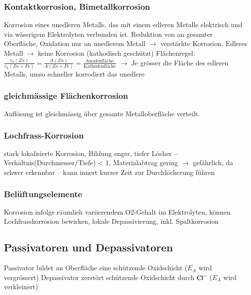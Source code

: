 {\subsubsection{Kontaktkorrosion, Bimetallkorrosion}
Korrosion eines unedleren Metalls, das mit einem edleren Metalle elektrisch und via wässrigem Elektrolyten verbunden ist.
Reduktion von  an gesamter Oberfläche, Oxidation nur an unedlerem Metall $\rightarrow$ verstärkte Korrosion, Edleres Metall $\rightarrow$ keine Korrosion (kathodisch geschützt) \newline
 Flächenregel: $\frac{v_k(Zn)}{v_k(Zn + Fe)} = \frac{A(Zn)}{A(Zn + Fe)} = \frac{\text{Anodenfläche}}{\text{Kathodenfläche}}$ \newline 
$\rightarrow$ Je grösser die Fläche des edleren Metalls, umso schneller korrodiert das unedlere

\subsubsection{gleichmässige Flächenkorrosion}
Auflösung ist gleichmässig über gesamte Metalloberfläche verteilt. 

\subsubsection{Lochfrass-Korrosion}
stark lokalisierte Korrosion, Bildung enger, tiefer Löcher – Verhältnis(Durchmesser/Tiefe) < 1, Materialabtrag gering \newline 
$\rightarrow$ gefährlich, da schwer erkennbar – kann innert kurzer Zeit zur Durchlöcherung führen

\subsubsection{Belüftungselemente}
Korrosion infolge räumlich variierendem O2-Gehalt im Elektrolyten, können Lochfrasskorrosion bewirken, lokale Depassivierung, inkl. Spaltkorrosion

}

\subsection{Passivatoren und Depassivatoren}
Passivator bildet an Oberfläche eine schützende Oxidschicht ($E_A$ wird vergrössert) \newline
Depassivator zerstört schützende Oxidschicht durch $\ce{Cl^-}$ ($E_A$ wird verkleinert)
